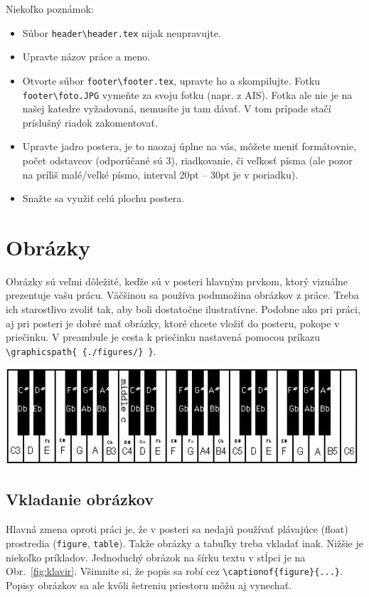 \documentclass[portrait,a0]{a0poster}
\begin{document}
\begin{multicols}{3}
	Niekoľko poznámok:
	\begin{itemize}
		\item Súbor \verb|header\header.tex| nijak neupravujte.
		\item Upravte názov práce a meno.
		\item Otvorte súbor \verb|footer\footer.tex|, upravte ho a skompilujte. Fotku \verb|footer\foto.JPG| vymeňte za svoju fotku (napr. z AIS). Fotka ale nie je na našej katedre vyžadovaná, nemusíte ju tam dávať. V tom prípade stačí príslušný riadok zakomentovať.
		\item Upravte jadro postera, je to naozaj úplne na vás, môžete meniť formátovnie, počet odstavcov (odporúčané sú 3), riadkovanie, či veľkosť písma (ale pozor na príliš malé/veľké písmo, interval 20pt -- 30pt je v poriadku).
		\item Snažte sa využiť celú plochu postera.
	\end{itemize}
	
	\section*{Obrázky}
	Obrázky sú veľmi dôležité, keďže sú v posteri hlavným prvkom, ktorý vizuálne prezentuje vašu prácu. Väčšinou sa používa podmnožina obrázkov z práce. Treba ich starostlivo zvoliť tak, aby boli dostatočne ilustratívne. Podobne ako pri práci, aj pri posteri je dobré mať obrázky, ktoré chcete vložiť do posteru, pokope v priečinku. V preambule je cesta k priečinku nastavená pomocou príkazu 
	\verb|\graphicspath{ {./figures/} }|.

	\begin{center}
		\includegraphics[width=\linewidth]{klavir2}
		\label{fig:klavir}
	\end{center}
	
	\subsection*{Vkladanie obrázkov}
	
	Hlavná zmena oproti práci je, že v posteri sa nedajú používať plávajúce (float) prostredia (\verb|figure|, \verb|table|). Takže obrázky a tabuľky treba vkladať inak. Nižšie je niekoľko príkladov. Jednoduchý obrázok na šírku textu v stĺpci je na Obr.~\ref{fig:klavir}. Všimnite si, že popis sa robí cez \verb|\captionof{figure}{...}|. Popisy obrázkov sa ale kvôli šetreniu priestoru môžu aj vynechať.
	

\end{multicols}
\end{document}
